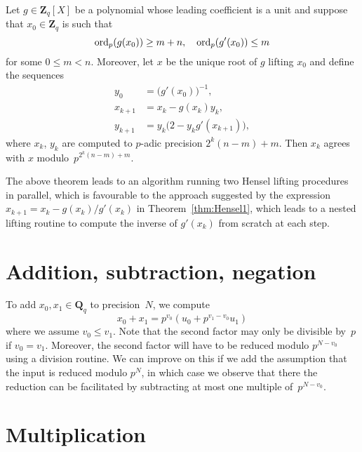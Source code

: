 \begin{thm} \label{thm:Hensel2}
Let $g \in \mathbf{Z}_q[X]$ be a polynomial whose leading coefficient 
is a unit and suppose that $x_0 \in \mathbf{Z}_q$ is such that 
\begin{equation*}
\operatorname{ord}_p(g(x_0)) \geq m + n, \quad \operatorname{ord}_p(g'(x_0)) \leq m
\end{equation*}
for some $0 \leq m < n$.  Moreover, let $x$ be the unique root of $g$ 
lifting $x_0$ and define the sequences
\begin{align*}
y_0 & = \bigl( g'(x_0) \bigr)^{-1}, \\
x_{k+1} & = x_k - g(x_k) y_k, \\
y_{k+1} & = y_k \bigl( 2 - y_k g'(x_{k+1}) \bigr),
\end{align*}
where $x_k$, $y_k$ are computed to $p$-adic precision $2^k (n-m) + m$.
Then $x_k$ agrees with $x$ modulo~$p^{2^k (n - m) + m}$.
\end{thm}

\begin{rem}
The above theorem leads to an algorithm running two Hensel lifting 
procedures in parallel, which is favourable to the approach suggested 
by the expression $x_{k+1} = x_k - g(x_k) / g'(x_k)$ in 
Theorem~\ref{thm:Hensel1}, which leads to a nested lifting routine to 
compute the inverse of $g'(x_k)$ from scratch at each step.
\end{rem}

\section{Addition, subtraction, negation}

To add $x_0, x_1 \in \mathbf{Q}_q$ to precision~$N$, we compute 
\begin{equation}
x_0 + x_1 = p^{v_0} (u_0 + p^{v_1 - v_0} u_1)
\end{equation}
where we assume $v_0 \leq v_1$.  Note that the second factor may 
only be divisible by~$p$ if $v_0 = v_1$.  Moreover, the second factor 
will have to be reduced modulo $p^{N - v_0}$ using a division 
routine.  We can improve on this if we add the assumption that 
the input is reduced modulo $p^N$, in which case we observe that 
there the reduction can be facilitated by subtracting at most 
one multiple of~$p^{N-v_0}$.

\section{Multiplication}

